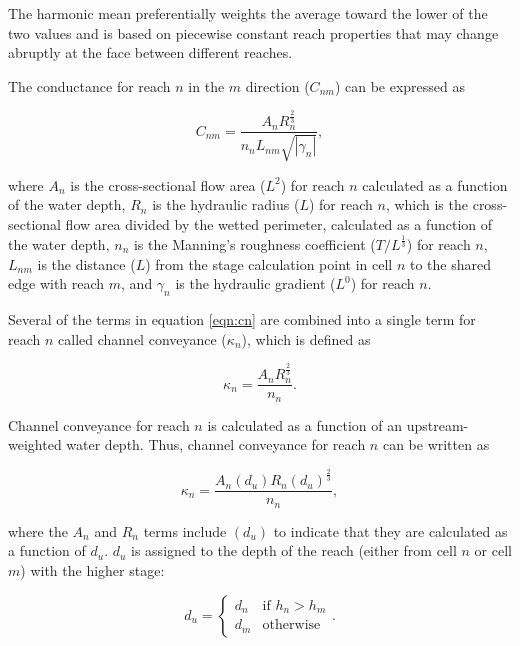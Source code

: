 \documentclass[fleqn]{article}
\begin{document}
\noindent The harmonic mean preferentially weights the average toward the lower of the two values and is based on piecewise constant reach properties that may change abruptly at the face between different reaches.

The conductance for reach $n$ in the $m$ direction ($C_{nm}$) can be expressed as

\begin{equation}
  C_{nm} = 
  \frac{
  A_n 
  R_{n}^{\frac{2}{3}}
  }
  {n_n
  L_{nm}
  \sqrt{| \gamma_n |}
  },
\label{eqn:cn}
\end{equation}

\noindent where $A_n$ is the cross-sectional flow area ($L^2$) for reach $n$ calculated as a function of the water depth, $R_n$ is the hydraulic radius ($L$) for reach $n$, which is the cross-sectional flow area divided by the wetted perimeter, calculated as a function of the water depth, $n_n$ is the Manning's roughness coefficient ($T/L^{\frac{1}{3}}$) for reach $n$, $L_{nm}$ is the distance ($L$) from the stage calculation point in cell $n$ to the shared edge with reach $m$, and $\gamma_n$ is the hydraulic gradient ($L^0$) for reach $n$.

Several of the terms in equation \ref{eqn:cn} are combined into a single term for reach $n$ called channel conveyance ($\kappa_n$), which is defined as

\begin{equation}
  \kappa_n = \frac{A_n R_n^{\frac{2}{3}}}{n_n}.
\label{eqn:conveyance}
\end{equation}

\noindent Channel conveyance for reach $n$ is calculated as a function of an upstream-weighted water depth.  Thus, channel conveyance for reach $n$ can be written as

\begin{equation}
  \kappa_n = \frac{A_n (d_u) R_n (d_u) ^{\frac{2}{3}}}{n_n},
\label{eqn:conveyancedu}
\end{equation}

\noindent where the $A_n$ and $R_n$ terms include $(d_u)$ to indicate that they are calculated as a function of $d_u$.  $d_u$ is assigned to the depth of the reach (either from cell $n$ or cell $m$) with the higher stage:

\[
d_u = 
\begin{cases}
  d_n & \text{if $h_n>h_m$} \\
  d_m & \text{otherwise}
\end{cases}.
\]
\end{document}
